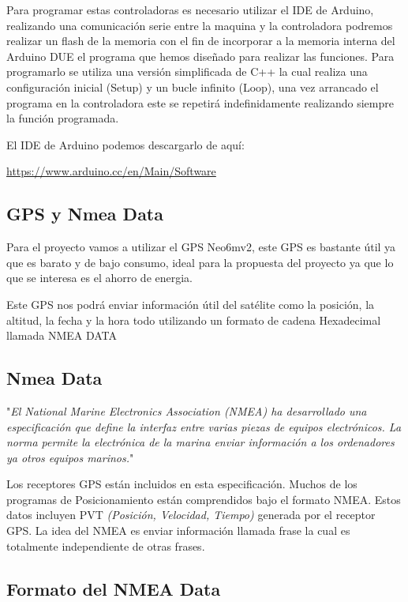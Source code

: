 \setlength{\parindent}{0ex}Para programar estas controladoras es necesario utilizar el IDE de Arduino, realizando una comunicación serie entre la maquina y la controladora podremos realizar un flash de la memoria con el fin de incorporar a la memoria interna del Arduino DUE el programa que hemos diseñado para realizar las funciones. 
Para programarlo se utiliza una versión simplificada de C++ la cual realiza una configuración inicial (Setup) y un bucle infinito (Loop), una vez arrancado el programa en la controladora este se repetirá indefinidamente realizando siempre la función programada. 

El IDE de Arduino podemos descargarlo de aquí:

\url{https://www.arduino.cc/en/Main/Software}

\subsection{GPS y Nmea Data}

Para el proyecto vamos a utilizar el GPS Neo6mv2, este GPS es bastante útil ya que es barato y de bajo consumo, ideal para la propuesta del proyecto ya que lo que se interesa es el ahorro de energia.

Este GPS nos podrá enviar información útil del satélite como la posición, la altitud, la fecha y la hora todo utilizando un formato de cadena Hexadecimal llamada NMEA DATA

\subsection{Nmea Data}

"\textit{El National Marine Electronics Association (NMEA) ha desarrollado una especificación que define la interfaz entre varias piezas de equipos electrónicos. La norma permite la electrónica de la  marina enviar información a los ordenadores ya otros equipos marinos.}"

Los receptores GPS están incluidos en esta especificación. Muchos de los programas de Posicionamiento están comprendidos bajo el formato NMEA. Estos datos incluyen PVT \textit{(Posición, Velocidad, Tiempo)} generada por el receptor GPS. La idea del NMEA es enviar información llamada frase la cual es totalmente independiente de otras frases.

\subsection{Formato del NMEA Data}

